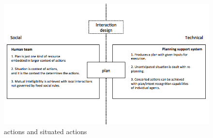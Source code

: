 \begin{figure}[h]
  \centering
  \includegraphics[width=1\textwidth]{img/approach/gap}
  \caption{ actions and situated actions}
  \label{fig:gap}
\end{figure}





